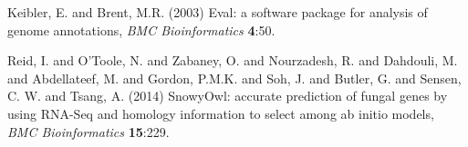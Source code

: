 \documentclass[a4paper,10pt]{article}
\begin{document}
\begin{thebibliography}{}
 Keibler, E. and Brent, M.R. (2003) Eval: a software package for analysis of genome annotations, \textit{BMC Bioinformatics} \textbf{4}:50.

Reid, I. and O'Toole, N. and Zabaney, O. and Nourzadesh, R. and Dahdouli, M. and Abdellateef, M. and Gordon, P.M.K. and Soh, J. and Butler, G. and Sensen, C. W. and Tsang, A. (2014) SnowyOwl: accurate prediction of fungal genes by using RNA-Seq and homology information to select among ab initio models, \textit{BMC Bioinformatics} \textbf{15}:229.



\end{thebibliography}
\end{document}
